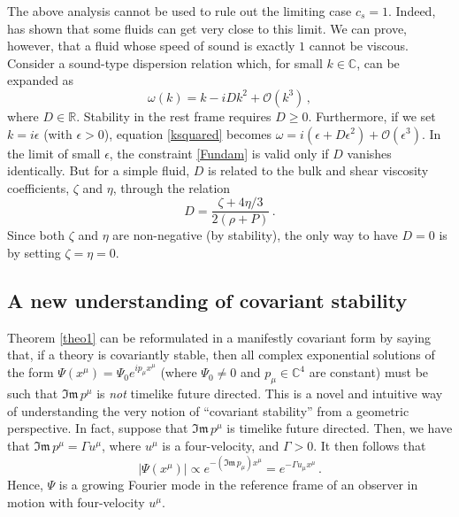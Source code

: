 \documentclass[a4paper, amsfonts, amssymb, amsmath, reprint, showkeys, nofootinbib, twoside,notitlepage]{revtex4-1}
\theoremstyle{definition}
\theoremstyle{theorem}
\theoremstyle{corollary}
\begin{document}
The above analysis cannot be used to rule out the limiting case $c_s =1$. Indeed, \citet{Zeldovich1961} has shown that some fluids can get very close to this limit. We can prove, however, that a fluid whose speed of sound is exactly $1$ cannot be viscous. Consider a sound-type dispersion relation which, for small $k \in \mathbb{C}$, can be expanded as
\begin{equation}\label{ksquared}
\omega(k)=k-iDk^2 +\mathcal{O}(k^3) \, ,
\end{equation}
where $D \in \mathbb{R}$. Stability in the rest frame requires $D \geq 0$. Furthermore, if we set $k=i \epsilon$ (with $\epsilon > 0$), equation \eqref{ksquared} becomes $\omega= i(\epsilon+D\epsilon^2)+\mathcal{O}(\epsilon^3)$. In the limit of small $\epsilon$, the constraint \eqref{Fundam} is valid only if $D$ vanishes identically. But for a simple fluid, $D$ is related to the bulk and shear viscosity coefficients, $\zeta$ and $\eta$, through the relation \cite{Kovtun2019} 
\begin{equation}
D = \dfrac{\zeta +4\eta/3}{2(\rho+P)} \, .
\end{equation}
Since both $\zeta$ and $\eta$ are non-negative (by stability), the only way to have $D=0$ is by setting $\zeta=\eta=0$.

\subsection{A new understanding of covariant stability}

Theorem \ref{theo1} can be reformulated in a manifestly covariant form by saying that, if a theory is covariantly stable, then all complex exponential solutions of the form $\Psi(x^\mu) {=} \Psi_0 e^{ip_\mu x^\mu}$ (where $\Psi_0 {\neq} 0$ and $p_\mu {\in} \mathbb{C}^4$ are constant) must be such that $\mathfrak{Im}\, p^\mu$ is \textit{not} timelike future directed. This is a novel and intuitive way of understanding  the very notion of ``covariant stability'' from a geometric perspective. In fact, suppose that $\mathfrak{Im}\, p^\mu$ is timelike future directed. Then, we have that $\mathfrak{Im}\, p^\mu= \Gamma u^\mu$, where $u^\mu$ is a four-velocity, and $\Gamma>0$. It then follows that
\begin{equation}
|\Psi(x^\mu)| \propto e^{-(\mathfrak{Im}\, p_\mu)x^\mu}= e^{-\Gamma u_\mu x^\mu}  \, .
\end{equation} 
Hence, $\Psi$ is a growing Fourier mode in the reference frame of an observer in motion with four-velocity $u^\mu$.
\end{document}
